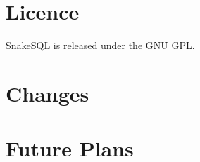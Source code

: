 \documentclass{howto}
\begin{document}





\section{Licence}

SnakeSQL is released under the GNU GPL.



\section{Changes}



\section{Future Plans}


\end{document}
